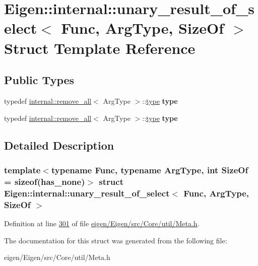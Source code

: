 \hypertarget{struct_eigen_1_1internal_1_1unary__result__of__select}{}\section{Eigen\+:\+:internal\+:\+:unary\+\_\+result\+\_\+of\+\_\+select$<$ Func, Arg\+Type, Size\+Of $>$ Struct Template Reference}
\label{struct_eigen_1_1internal_1_1unary__result__of__select}
\subsection*{Public Types}
\begin{DoxyCompactItemize}
\item 
\mbox{\label{struct_eigen_1_1internal_1_1unary__result__of__select_a164de616f14ad782f4de9221b84bc238}} 
typedef \hyperlink{struct_eigen_1_1internal_1_1remove__all}{internal\+::remove\+\_\+all}$<$ Arg\+Type $>$\+::\hyperlink{group___sparse_core___module}{type} {\bfseries type}
\item 
\mbox{\label{struct_eigen_1_1internal_1_1unary__result__of__select_a164de616f14ad782f4de9221b84bc238}} 
typedef \hyperlink{struct_eigen_1_1internal_1_1remove__all}{internal\+::remove\+\_\+all}$<$ Arg\+Type $>$\+::\hyperlink{group___sparse_core___module}{type} {\bfseries type}
\end{DoxyCompactItemize}


\subsection{Detailed Description}
\subsubsection*{template$<$typename Func, typename Arg\+Type, int Size\+Of = sizeof(has\+\_\+none)$>$\newline
struct Eigen\+::internal\+::unary\+\_\+result\+\_\+of\+\_\+select$<$ Func, Arg\+Type, Size\+Of $>$}



Definition at line \hyperlink{eigen_2_eigen_2src_2_core_2util_2_meta_8h_source_l00301}{301} of file \hyperlink{eigen_2_eigen_2src_2_core_2util_2_meta_8h_source}{eigen/\+Eigen/src/\+Core/util/\+Meta.\+h}.



The documentation for this struct was generated from the following file\+:\begin{DoxyCompactItemize}
\item 
eigen/\+Eigen/src/\+Core/util/\+Meta.\+h\end{DoxyCompactItemize}
